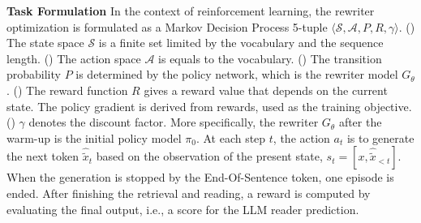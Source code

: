 \noindent \textbf{Task Formulation} \quad
In the context of reinforcement learning, the rewriter optimization is formulated as a Markov Decision Process 5-tuple $\langle\mathcal{S}, \mathcal{A}, P, R, \gamma \rangle$. 
() The state space $\mathcal{S}$ is a finite set limited by the vocabulary and the sequence length. 
() The action space $\mathcal{A}$ is equals to the vocabulary.
() The transition probability $P$ is determined by the policy network, which is the rewriter model $G_{\theta}$.
() The reward function $R$ gives a reward value that depends on the current state. The policy gradient is derived from rewards, used as the training objective.
() $\gamma$ denotes the discount factor.
More specifically, the rewriter $G_{\theta}$ after the warm-up is the initial policy model $\pi_{0}$. 
At each step $t$, the action $a_t$ is to generate the next token $\hat{\tilde{x}}_{t}$ based on the observation of the present state, $s_t = [x, \hat{\tilde{x}}_{<t}]$. 
When the generation is stopped by the End-Of-Sentence token, one episode is ended. 
After finishing the retrieval and reading, a reward is computed by evaluating the final output, i.e., a score for the LLM reader prediction.

